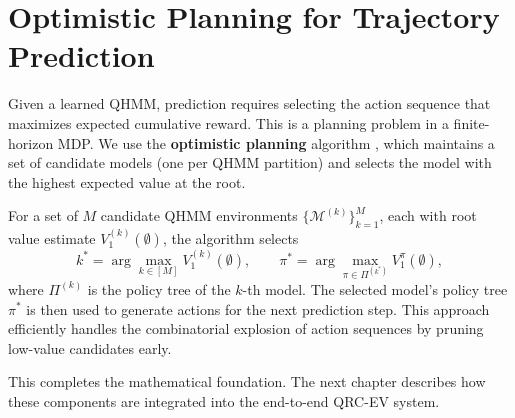 \section{Optimistic Planning for Trajectory Prediction}
\label{sec:optimistic_planning}

Given a learned QHMM, prediction requires selecting the action sequence
that maximizes expected cumulative reward. This is a planning problem
in a finite-horizon MDP. We use the \textbf{optimistic planning}
algorithm \citep{buşoniu2020online}, which maintains a set of candidate
models (one per QHMM partition) and selects the model with the highest
expected value at the root.


For a set of $M$ candidate QHMM environments
$\{\mathcal{M}^{(k)}\}_{k=1}^M$, each with root value estimate
$V^{(k)}_1(\emptyset)$, the algorithm selects
\begin{equation}
k^* = \arg\max_{k \in [M]} V^{(k)}_1(\emptyset),
\qquad
\pi^* = \arg\max_{\pi \in \Pi^{(k^*)}} V^{\pi}_1(\emptyset),
\label{eq:optimistic_plan}
\end{equation}
where $\Pi^{(k)}$ is the policy tree of the $k$-th model. The selected
model's policy tree $\pi^*$ is then used to generate actions for the
next prediction step. This approach efficiently handles the
combinatorial explosion of action sequences by pruning low-value
candidates early.


This completes the mathematical foundation. The next chapter describes
how these components are integrated into the end-to-end QRC-EV system.
